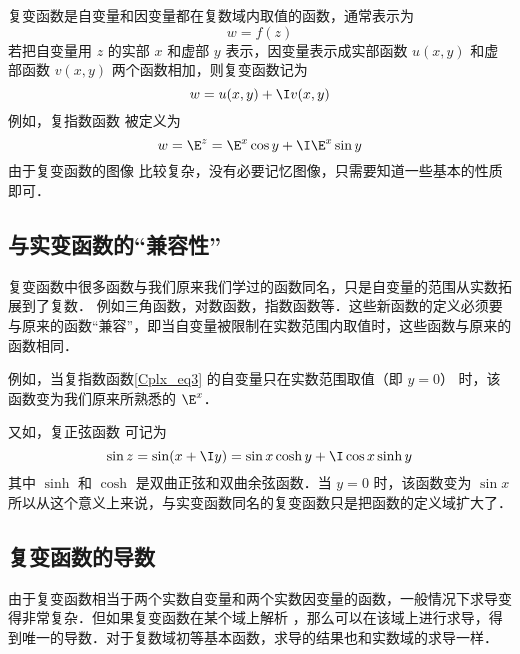 
复变函数是自变量和因变量都在复数域内取值的函数，通常表示为
\begin{equation}
w = f(z)
\end{equation}
若把自变量用 $z$ 的实部 $x$ 和虚部 $y$ 表示，因变量表示成实部函数 $u(x,y)$ 和虚部函数 $v(x,y)$ 两个函数相加，则复变函数记为
\begin{equation}
w = u(x,y) + \I v(x,y)
\end{equation}
例如，复指数函数 被定义为
\begin{equation}\label{Cplx_eq3}
w = \E^z = \E^x \cos y + \I \E^x\sin y
\end{equation}
由于复变函数的图像%
比较复杂，没有必要记忆图像，只需要知道一些基本的性质即可．

\subsection{与实变函数的“兼容性”}
复变函数中很多函数与我们原来我们学过的函数同名，只是自变量的范围从实数拓展到了复数． 例如三角函数，对数函数，指数函数等．这些新函数的定义必须要与原来的函数“兼容”，即当自变量被限制在实数范围内取值时，这些函数与原来的函数相同．

例如，当复指数函数\autoref{Cplx_eq3} 的自变量只在实数范围取值（即 $y = 0$） 时，该函数变为我们原来所熟悉的 $\E^x$． 

又如，复正弦函数 可记为
\begin{equation}
\sin z = \sin(x + \I y) = \sin x\cosh y + \I\cos x\sinh y
\end{equation}
其中 $\sinh $ 和 $\cosh $ 是双曲正弦和双曲余弦函数．当 $y = 0$ 时，该函数变为 $\sin x$ 
所以从这个意义上来说，与实变函数同名的复变函数只是把函数的定义域扩大了．

\subsection{复变函数的导数}
由于复变函数相当于两个实数自变量和两个实数因变量的函数，一般情况下求导变得非常复杂．但如果复变函数在某个域上解析%
，那么可以在该域上进行求导，得到唯一的导数．对于复数域初等基本函数，求导的结果也和实数域的求导一样．


